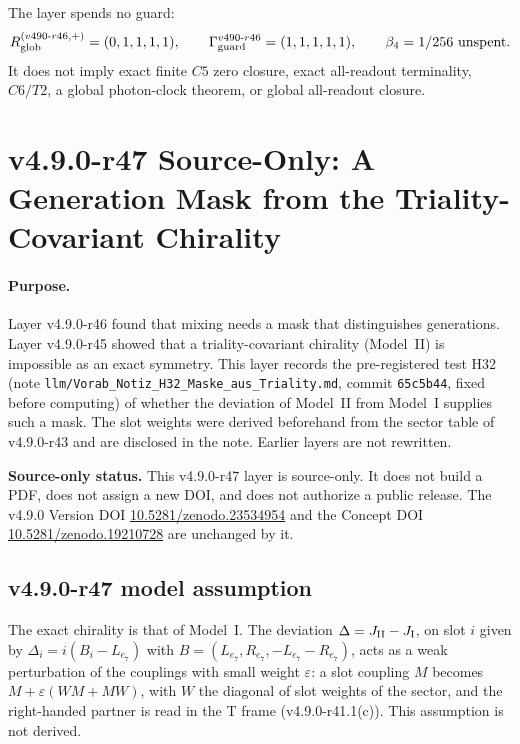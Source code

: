 The layer spends no guard:
\[
R_{\rm glob}^{(v490\text{-}r46,+)}=(0,1,1,1,1),
\qquad
\Gamma_{\rm guard}^{v490\text{-}r46}=(1,1,1,1,1),
\qquad
\beta_4=1/256\ \text{unspent}.
\]
It does not imply exact finite \(C5\) zero closure, exact all-readout terminality,
\(C6/T2\), a global photon-clock theorem, or global all-readout closure.
\clearpage
\section*{v4.9.0-r47 Source-Only: A Generation Mask from the Triality-Covariant Chirality}
\label{sec:v490-r47-mask-from-triality}

\paragraph{Purpose.}
Layer v4.9.0-r46 found that mixing needs a mask that distinguishes generations.  Layer v4.9.0-r45 showed that a triality-covariant chirality
(Model~II) is impossible as an exact symmetry.  This layer records the pre-registered test H32 (note
\texttt{llm/Vorab\_Notiz\_H32\_Maske\_aus\_Triality.md}, commit \texttt{65c5b44}, fixed before computing) of whether the deviation of
Model~II from Model~I supplies such a mask.  The slot weights were derived beforehand from the sector table of v4.9.0-r43 and are disclosed
in the note.  Earlier layers are not rewritten.

\noindent\textbf{Source-only status.}
This v4.9.0-r47 layer is source-only.  It does not build a PDF, does not assign a new DOI,
and does not authorize a public release.  The v4.9.0 Version DOI
\href{https://doi.org/10.5281/zenodo.23534954}{10.5281/zenodo.23534954} and the Concept DOI
\href{https://doi.org/10.5281/zenodo.19210728}{10.5281/zenodo.19210728} are unchanged by it.

\subsection*{v4.9.0-r47 model assumption}
\label{subsec:v490-r47-assumption}

The exact chirality is that of Model~I.  The deviation \(\Delta=J_{\rm II}-J_{\rm I}\), on slot \(i\) given by \(\Delta_i=i(B_i-L_{e_7})\) with
\(B=(L_{e_7},R_{e_7},-L_{e_7}-R_{e_7})\), acts as a weak perturbation of the couplings with small weight \(\varepsilon\): a slot coupling \(M\) becomes
\(M+\varepsilon(WM+MW)\), with \(W\) the diagonal of slot weights of the sector, and the right-handed partner is read in the T frame
(v4.9.0-r41.1(c)).  This assumption is not derived.

